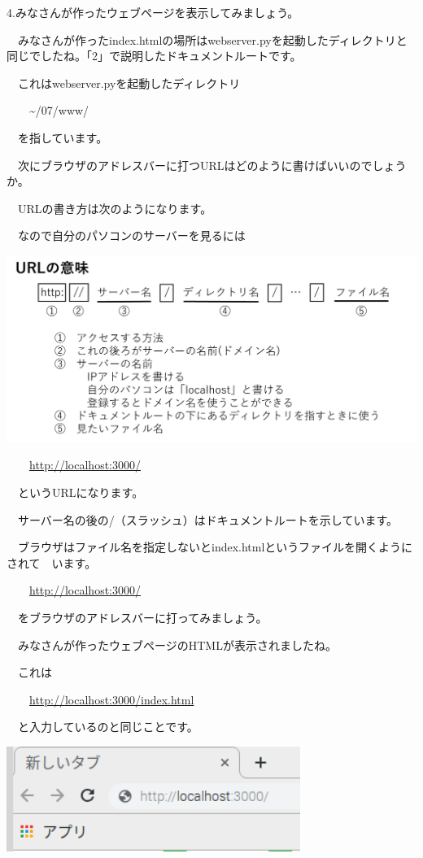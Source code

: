\documentclass[a4paper,12pt,dvipdfmx]{jarticle}
\begin{document}
\bigskip

4.みなさんが作ったウェブページを表示してみましょう。

\ \ みなさんが作ったindex.htmlの場所はwebserver.pyを起動したディレクトリと同じでしたね。「2」で説明したドキュメントルートです。

\ \ これはwebserver.pyを起動したディレクトリ

\ \ 　{\textasciitilde}/07/www/

\ \ を指しています。


\bigskip

\ \ 次にブラウザのアドレスバーに打つURLはどのように書けばいいのでしょうか。

\ \ URLの書き方は次のようになります。

\ \ なので自分のパソコンのサーバーを見るには

\centering
\includegraphics[width=13.894cm]{ome7-img040.png}
\flushleft

\ \ 　\url{http://localhost:3000/}

\ \ というURLになります。

\ \ サーバー名の後の/（スラッシュ）はドキュメントルートを示しています。

\ \ ブラウザはファイル名を指定しないとindex.htmlというファイルを開くようにされて\ \ います。

\ \ 　\url{http://localhost:3000/}

\ \ をブラウザのアドレスバーに打ってみましょう。

\ \ みなさんが作ったウェブページのHTMLが表示されましたね。

\ \ これは

\ \ 　\url{http://localhost:3000/index.html}

\ \ と入力しているのと同じことです。



\centering
\includegraphics[width=9.551cm]{ome7-img041.png}
\flushleft
\end{document}
